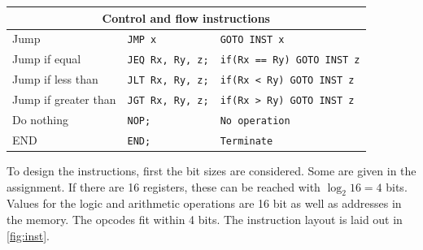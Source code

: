 \documentclass[a4paper, english]{article}
\numberwithin{equation}{section}
\begin{document}
\begin{table}[H]
\begin{tabular}{lll}
        \midrule
        \multicolumn{3}{c}{Control and flow instructions}                                    \\
        \midrule
        Jump                  & \texttt{JMP x}           & \texttt{GOTO INST x}              \\
        Jump if equal         & \texttt{JEQ Rx, Ry, z;}  & \texttt{if(Rx == Ry) GOTO INST z} \\
        Jump if less than     & \texttt{JLT Rx, Ry, z;}  & \texttt{if(Rx < Ry) GOTO INST z}  \\
        Jump if greater than  & \texttt{JGT Rx, Ry, z;}  & \texttt{if(Rx > Ry) GOTO INST z}  \\
        Do nothing            & \texttt{NOP;}            & \texttt{No operation}             \\
        END                   & \texttt{END;}            & \texttt{Terminate}                \\
        \bottomrule
    \end{tabular}
\end{table}
To design the instructions, first the bit sizes are considered. Some are given in the assignment. If there are 16 registers, these can be reached with \(\log_2{16} = 4\) bits. Values for the logic and arithmetic operations are 16 bit as well as addresses in the memory. The opcodes fit within 4 bits.\newline
The instruction layout is laid out in \cref{fig:inst}.
\end{document}
